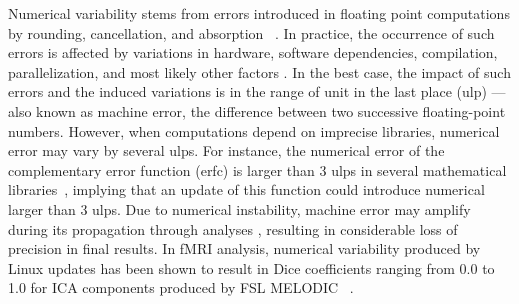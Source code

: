 \documentclass[11pt,onecolumn]{article}
\begin{document}
Numerical variability stems from errors introduced in floating point
computations by  rounding, cancellation, and absorption~\cite{muller2018handbook} . In
practice, the occurrence of such errors is affected by variations in
hardware, software dependencies, compilation, parallelization, and most
likely other factors . In the best case, the impact of such errors and the induced
variations is in the range of   unit in the last place (ulp) --- also known
as machine error, the difference between two successive floating-point
numbers. However, when computations depend on imprecise libraries,
numerical error may vary by several ulps. For instance, the  numerical error
of the complementary error function (erfc) is larger than 3 ulps in several
mathematical libraries~\cite{zimmermann:hal-03141101}, implying that an update of this function could introduce
numerical   larger than 3 ulps. Due to numerical instability,
machine error may amplify during its propagation through analyses ,
resulting in considerable loss of precision in final results. In fMRI analysis,
numerical variability produced by Linux updates has been shown to result in Dice
coefficients ranging from 0.0 to 1.0 for ICA components produced by FSL
MELODIC~\cite{Glatard2015} .
\end{document}
